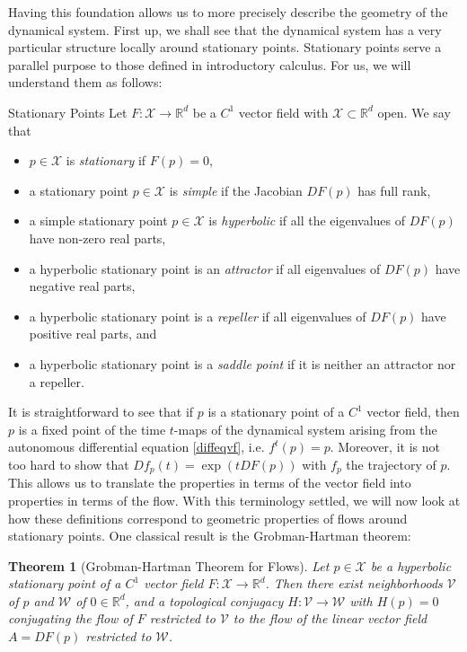 \documentclass[11pt, a4paper]{memoir}
\theoremstyle{break}
\newtheorem{thm}{Theorem}
\theoremstyle{break}
\theoremstyle{nonumberplain}
\newcommand{\mR}{\mathbb{R}}
\begin{document}
Having this foundation allows us to more precisely describe the geometry of the dynamical system. First up, we shall see that the dynamical system has a very particular structure locally around stationary points. Stationary points serve a parallel purpose to those defined in introductory calculus. For us, we will understand them as follows:
\begin{mydefinition}{Stationary Points}
Let $F:\mathcal{X}\to \mR^d$ be a $C^1$ vector field with $\mathcal{X}\subset \mR^d$ open. We say that
\begin{itemize}
	\item $p\in \mathcal{X}$ is \emph{stationary} if $F(p)=0$,
	\item a stationary point $p\in \mathcal{X}$ is \emph{simple} if the Jacobian $DF(p)$ has full rank,
	\item a simple stationary point $p\in \mathcal{X}$ is \emph{hyperbolic} if all the eigenvalues of $DF(p)$ have non-zero real parts,
	\item a hyperbolic stationary point is an \emph{attractor} if all eigenvalues of $DF(p)$ have negative real parts,
	\item a hyperbolic stationary point is a \emph{repeller} if all eigenvalues of $DF(p)$ have positive real parts, and
	\item a hyperbolic stationary point is a \emph{saddle point} if it is neither an attractor nor a repeller.	
\end{itemize}
\end{mydefinition}
It is straightforward to see that if $p$ is a stationary point of a $C^1$ vector field, then $p$ is a fixed point of the time $t$-maps of the dynamical system arising from the autonomous differential equation \ref{diffeqvf}, i.e. $f^t(p)=p$. Moreover, it is not too hard to show that $Df_p(t)=\exp(tDF(p))$ with $f_p$ the trajectory of $p$. This allows us to translate the properties in terms of the vector field into properties in terms of the flow. With this terminology settled, we will now look at how these definitions correspond to geometric properties of flows around stationary points. One classical result is the Grobman-Hartman theorem:
\begin{thm}[Grobman-Hartman Theorem for Flows]
Let $p\in \mathcal{X}$ be a hyperbolic stationary point of a $C^1$ vector field $F:\mathcal{X}\to\mR^d$. Then there exist neighborhoods $\mathcal{V}$ of $p$ and $\mathcal{W}$ of $0\in \mR^d$, and a topological conjugacy $H:\mathcal{V}\to\mathcal{W}$ with $H(p)=0$ conjugating the flow of $F$ restricted to $\mathcal{V}$ to the flow of the linear vector field $A=DF(p)$ restricted to $\mathcal{W}$.
\end{thm}
\end{document}
